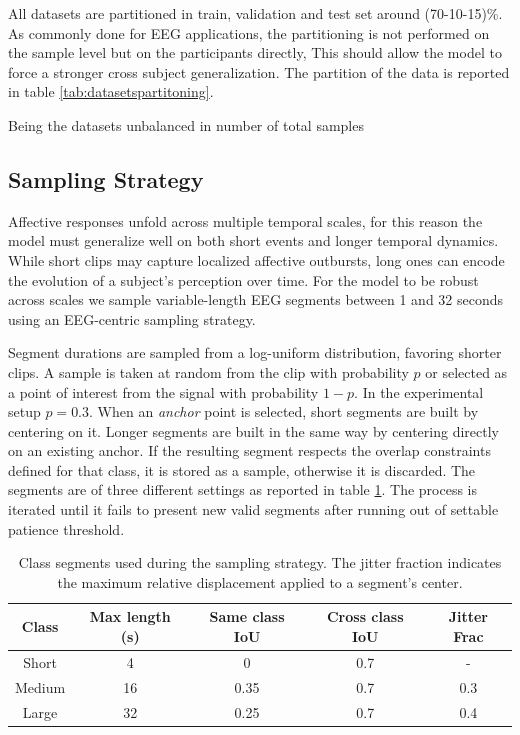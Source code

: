 All datasets are partitioned in train, validation and test set around (70-10-15)\%.
As commonly done for EEG applications, the partitioning is not performed on the sample level but on the participants directly,
This should allow the model to force a stronger cross subject generalization.
The partition of the data is reported in table \ref{tab:datasetspartitoning}.

Being the datasets unbalanced in number of total samples

\subsection{Sampling Strategy}
Affective responses unfold across multiple temporal scales, for this reason the model must generalize well on both short events and longer temporal dynamics.
While short clips may capture localized affective outbursts, long ones can encode the evolution of a subject's perception over time.
For the model to be robust across scales we sample variable-length EEG segments between 1 and 32 seconds using an EEG-centric sampling strategy.

Segment durations are sampled from a log-uniform distribution, favoring shorter clips.
A sample is taken at random from the clip with probability $p$ or selected as a point of interest from the signal with probability $1-p$.
In the experimental setup $p=0.3$.
When an \textit{anchor} point is selected, short segments are built by centering on it.
Longer segments are built in the same way by centering directly on an existing anchor.
If the resulting segment respects the overlap constraints defined for that class, it is stored as a sample, otherwise it is discarded.
The segments are of three different settings as reported in table \ref{tab:sample}.
The process is iterated until it fails to present new valid segments after running out of settable patience threshold.


\begin{table}
    \centering
    \begin{tabular}{c|c|c|c|c}

        Class  & Max length (s) & Same class IoU & Cross class IoU & Jitter Frac \\ \hline
        Short  & 4              & 0              & 0.7             & -           \\
        Medium & 16             & 0.35           & 0.7             & 0.3         \\
        Large  & 32             & 0.25           & 0.7             & 0.4         \\
    \end{tabular}
    \caption{ Class segments used during the sampling strategy.
    The jitter fraction indicates the maximum relative displacement applied to a segment's center. }
    \label{tab:sample}
\end{table}

